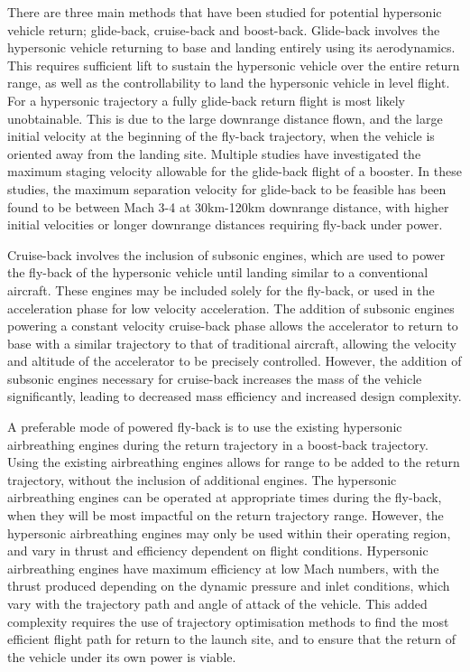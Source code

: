 There are three main methods that have been studied for potential hypersonic vehicle return; glide-back, cruise-back and boost-back. Glide-back involves the hypersonic vehicle returning to base and landing entirely using its aerodynamics. This requires sufficient lift to sustain the hypersonic vehicle over the entire return range, as well as the controllability to land the hypersonic vehicle in level flight. 
For a hypersonic trajectory a fully glide-back return flight is most likely unobtainable. This is due to the large downrange distance flown, and the large initial velocity at the beginning of the fly-back trajectory, when the vehicle is oriented away from the landing site. Multiple studies have investigated the maximum staging velocity allowable for the glide-back flight of a booster. 
In these studies, the maximum separation velocity for glide-back to be feasible has been found to be between Mach 3-4 at 30km-120km downrange distance, with higher initial velocities or longer downrange distances requiring fly-back under power\cite{Hellman,Tetlow1992}.

Cruise-back involves the inclusion of subsonic engines, which are used to power the fly-back of the hypersonic vehicle until landing similar to a conventional aircraft. These engines may be included solely for the fly-back\cite{Hellman}, or used in the acceleration phase for low velocity acceleration\cite{Mehta2001,Tetlow1992,Wilhite1991}. The addition of subsonic engines powering a constant velocity cruise-back phase allows the accelerator to return to base with a similar trajectory to that of traditional aircraft, allowing the velocity and altitude of the accelerator to be precisely controlled. However, the addition of subsonic engines necessary for cruise-back increases the mass of the vehicle significantly, leading to decreased mass efficiency and increased design complexity\cite{Hellman}. 

A preferable mode of powered fly-back is to use the existing hypersonic airbreathing engines during the return trajectory in a boost-back trajectory. Using the existing airbreathing engines allows for range to be added to the return trajectory, without the inclusion of additional engines. The hypersonic airbreathing engines can be operated at appropriate times during the fly-back, when they will be most impactful on the return trajectory range. However, the hypersonic airbreathing engines may only be used within their operating region, and vary in thrust and efficiency dependent on flight conditions. Hypersonic airbreathing engines have maximum efficiency at low Mach numbers\cite{Preller2017}, with the thrust produced depending on the dynamic pressure and inlet conditions, which vary with the trajectory path and angle of attack of the vehicle. This added complexity requires the use of trajectory optimisation methods to find the most efficient flight path for return to the launch site, and to ensure that the return of the vehicle under its own power is viable. 

